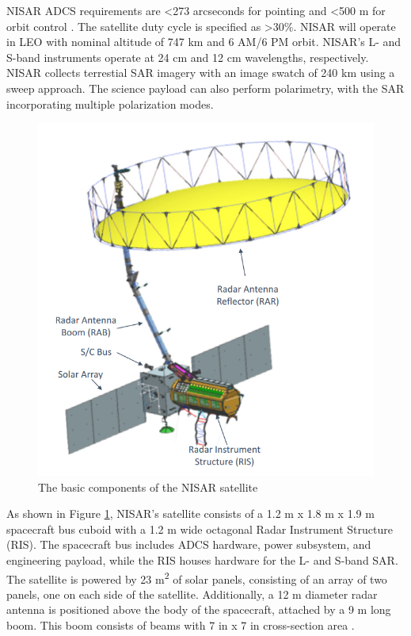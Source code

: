 NISAR ADCS requirements are \textless 273 arcseconds for pointing and \textless 500 m for orbit control \cite{Siqueira}. The satellite duty cycle is specified as \textgreater 30\%. NISAR will operate in LEO with nominal altitude of 747 km and 6 AM/6 PM orbit. NISAR's L- and S-band instruments operate at 24 cm and 12 cm wavelengths, respectively. NISAR collects terrestial SAR imagery with an image swatch of 240 km using a sweep approach. The science payload can also perform polarimetry, with the SAR incorporating multiple polarization modes.

\begin{figure}[H]
\centering
\includegraphics[scale=0.38]{Images/nisar_diagram.jpg}
\caption{The basic components of the NISAR satellite}
\label{NISAR Diagram}
\end{figure}

As shown in Figure \ref{NISAR Diagram}, NISAR's satellite consists of a 1.2 m x 1.8 m x 1.9 m spacecraft bus cuboid with a 1.2 m wide octagonal Radar Instrument Structure (RIS). The spacecraft bus includes ADCS hardware, power subsystem, and engineering payload, while the RIS houses hardware for the L- and S-band SAR. The satellite is powered by 23 m\textsuperscript{2} of solar panels, consisting of an array of two panels, one on each side of the satellite. Additionally, a 12 m diameter radar antenna is positioned above the body of the spacecraft, attached by a 9 m long boom. This boom consists of beams with 7 in x 7 in cross-section area \cite{NISARMission}.


